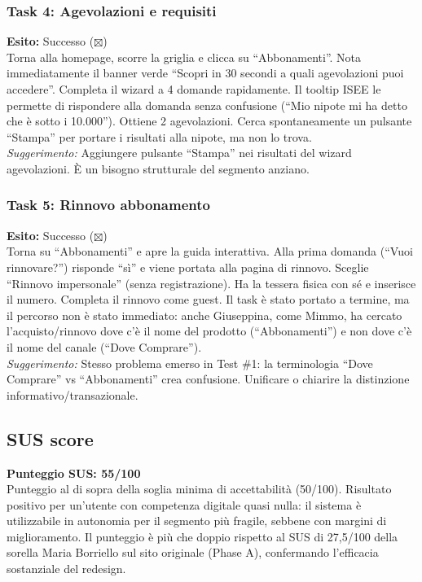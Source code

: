 ﻿\documentclass[11pt,a4paper]{article}
\begin{document}
\begin{tcolorbox}[base]
\vspace{0.3cm}

\subsubsection*{Task 4: Agevolazioni e requisiti}
\noindent\textbf{Esito:} Successo ($\boxtimes$)\\[0.2cm]
Torna alla homepage, scorre la griglia e clicca su
``Abbonamenti''. Nota immediatamente il banner verde
``Scopri in 30 secondi a quali agevolazioni puoi accedere''.
Completa il wizard a 4 domande rapidamente. Il tooltip
ISEE le permette di rispondere alla domanda senza
confusione (``Mio nipote mi ha detto che è sotto i 10.000'').
Ottiene 2 agevolazioni. Cerca spontaneamente un pulsante
``Stampa'' per portare i risultati alla nipote, ma non lo
trova.\\[0.2cm]
\textit{Suggerimento:} Aggiungere pulsante ``Stampa'' nei
risultati del wizard agevolazioni. È un bisogno strutturale
del segmento anziano.

\vspace{0.3cm}

\subsubsection*{Task 5: Rinnovo abbonamento}
\noindent\textbf{Esito:} Successo ($\boxtimes$)\\[0.2cm]
Torna su ``Abbonamenti'' e apre la guida interattiva. Alla
prima domanda (``Vuoi rinnovare?'') risponde ``sì'' e viene
portata alla pagina di rinnovo. Sceglie ``Rinnovo
impersonale'' (senza registrazione). Ha la tessera fisica
con sé e inserisce il numero. Completa il rinnovo come
guest. Il task è stato portato a termine, ma il percorso
non è stato immediato: anche Giuseppina, come Mimmo, ha
cercato l'acquisto/rinnovo dove c'è il nome del prodotto
(``Abbonamenti'') e non dove c'è il nome del canale
(``Dove Comprare'').\\[0.2cm]
\textit{Suggerimento:} Stesso problema emerso in Test \#1:
la terminologia ``Dove Comprare'' vs ``Abbonamenti'' crea
confusione. Unificare o chiarire la distinzione
informativo/transazionale.

\end{tcolorbox}

\subsection*{SUS score}
\begin{tcolorbox}[base]
\textbf{Punteggio SUS: 55/100}\\[0.2cm]
\small Punteggio al di sopra della soglia minima di
accettabilità (50/100). Risultato positivo per un'utente
con competenza digitale quasi nulla: il sistema è utilizzabile
in autonomia per il segmento più fragile, sebbene con margini
di miglioramento. Il punteggio è più che doppio rispetto al
SUS di 27,5/100 della sorella Maria Borriello sul sito
originale (Phase A), confermando l'efficacia sostanziale del
redesign.
\end{tcolorbox}
\end{document}
